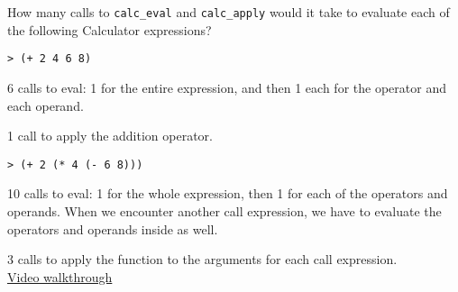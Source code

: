 \question How many calls to {\tt calc\_eval} and {\tt calc\_apply} would it
take to evaluate each of the following Calculator expressions?

\begin{lstlisting}
> (+ 2 4 6 8)
\end{lstlisting}
\begin{solution}[0.2in]
6 calls to eval: 1 for the entire expression, and then 1 each for the operator
and each operand.

1 call to apply the addition operator.
\end{solution}

\begin{lstlisting}
> (+ 2 (* 4 (- 6 8)))
\end{lstlisting}
\begin{solution}[0.2in]
10 calls to eval: 1 for the whole expression, then 1 for each of the operators
and operands. When we encounter another call expression, we have to evaluate
the operators and operands inside as well.

3 calls to apply the function to the arguments for each call expression.\\
\href{https://youtu.be/ZHPdJzZ3g14}{Video walkthrough}
\end{solution}
